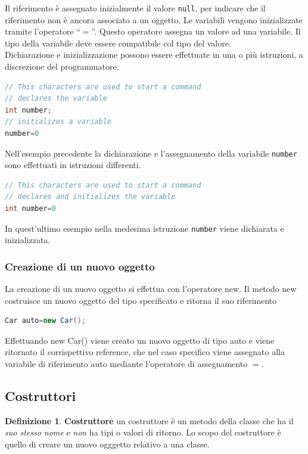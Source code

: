 \documentclass{article}
\theoremstyle{definition}
\newtheorem{mydef}{Definizione}
\begin{document}
Il riferimento \`e assegnato inizialmente il valore \texttt{null}, per indicare che il riferimento non \`e ancora associato a un oggetto.
Le variabili vengono inizializzate tramite l'operatore ``$=$''. Questo operatore assegna un valore ad una variabile.
Il tipo della variabile deve essere compatibile col tipo del valore.\\
Dichiarazione e inizializzazione possono essere effettuate in una o  pi\`u istruzioni, a discrezione
del programmatore.
\begin{lstlisting}[language=Java,escapechar=|]
// This characters are used to start a command
// declares the variable
int number;
// initializes a variable
number=0
\end{lstlisting}
Nell'esempio precedente la dichiarazione e l'assegnamento della variabile \texttt{number} sono
effettuati in istruzioni differenti.
\begin{lstlisting}[language=Java,escapechar=|]
// This characters are used to start a command
// declares and initializes the variable
int number=0
\end{lstlisting}
In quest'ultimo esempio nella medesima istruzione \texttt{number} viene dichiarata e inizializzata.

\subsubsection{Creazione di un nuovo oggetto}
La creazione di un nuovo oggetto si effettua con l'operatore new. Il metodo new costruisce un nuovo oggetto del tipo specificato e ritorna il suo riferimento
\begin{lstlisting}[language=Java,escapechar=|]
Car auto=new Car();
\end{lstlisting}
Effettuando new Car() viene creato un nuovo oggetto di tipo auto e viene ritornato il corrispettivo reference, che nel caso specifico viene assegnato alla variabile di riferimento auto mediante l'operatore di assegnamento $=$.

\subsection{Costruttori}
\begin{mydef} \textbf{Costruttore} un costruttore \`e un metodo della classe che ha il \emph{suo stesso nome} e \emph{non} ha tipi o valori di ritorno. Lo scopo del costruttore \`e quello di creare un nuovo ogggetto relativo a una classe.
\end{mydef}
\end{document}
